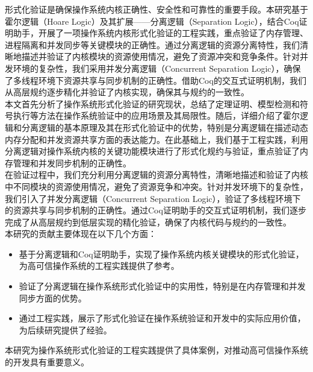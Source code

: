 \begin{cabstract}
\indent 形式化验证是确保操作系统内核正确性、安全性和可靠性的重要手段。本研究基于霍尔逻辑（Hoare Logic）及其扩展——分离逻辑（Separation Logic），结合Coq证明助手，开展了一项操作系统内核形式化验证的工程实践，重点验证了内存管理、进程隔离和并发同步等关键模块的正确性。通过分离逻辑的资源分离特性，我们清晰地描述并验证了内核模块的资源使用情况，避免了资源冲突和竞争条件。针对并发环境的复杂性，我们采用并发分离逻辑（Concurrent Separation Logic），确保了多线程环境下资源共享与同步机制的正确性。借助Coq的交互式证明机制，我们从高层规约逐步精化并验证了内核实现，确保其与规约的一致性。\\
\indent 本文首先分析了操作系统形式化验证的研究现状，总结了定理证明、模型检测和符号执行等方法在操作系统验证中的应用场景及其局限性。随后，详细介绍了霍尔逻辑和分离逻辑的基本原理及其在形式化验证中的优势，特别是分离逻辑在描述动态内存分配和并发资源共享方面的表达能力。在此基础上，我们基于工程实践，利用分离逻辑对操作系统内核的关键功能模块进行了形式化规约与验证，重点验证了内存管理和并发同步机制的正确性。\\
\indent 在验证过程中，我们充分利用分离逻辑的资源分离特性，清晰地描述和验证了内核中不同模块的资源使用情况，避免了资源竞争和冲突。针对并发环境下的复杂性，我们引入了并发分离逻辑（Concurrent Separation Logic），验证了多线程环境下的资源共享与同步机制的正确性。通过Coq证明助手的交互式证明机制，我们逐步完成了从高层规约到低层实现的精化验证，确保了内核代码与规约的一致性。\\
\indent 本研究的贡献主要体现在以下几个方面：
\begin{itemize}
    \item 基于分离逻辑和Coq证明助手，实现了操作系统内核关键模块的形式化验证，为高可信操作系统的工程实践提供了参考。
    \item 验证了分离逻辑在操作系统形式化验证中的实用性，特别是在内存管理和并发同步方面的优势。
    \item 通过工程实践，展示了形式化验证在操作系统验证和开发中的实际应用价值，为后续研究提供了经验。
\end{itemize}
\indent 本研究为操作系统形式化验证的工程实践提供了具体案例，对推动高可信操作系统的开发具有重要意义。
\end{cabstract}
